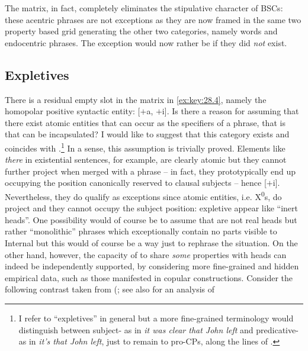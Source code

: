 \documentclass[output=paper]{langsci/langscibook}
\begin{document}
The matrix, in fact, completely eliminates the stipulative character of \glspl{BSC}:
these acentric phrases are not exceptions as they are now framed in the same
two property based grid generating the other two categories, namely words and
endocentric phrases. The exception would now rather be if they did \emph{not}
exist.

\subsection{Expletives}

There is a residual empty slot in the matrix in \eqref{ex:key:28.4}, namely the
homopolar positive syntactic entity: [$+$a, $+$i]. Is there a reason for assuming
that there exist atomic entities that can occur as the specifiers of a phrase,
that is that can be incapsulated? I would like to suggest that this category
exists and coincides with .\footnote{I refer to “expletives” in
    general but a more fine-grained terminology would distinguish between
    subject- as in \emph{it was clear that John left} and
    predicative- as in \emph{it's that John left}, just to remain to
    pro-CPs, along the lines of \citet{Moro1997}.} In a sense, this assumption
    is trivially proved. Elements like \emph{there} in  existential
    sentences, for example, are clearly atomic but they cannot further project
    when merged with a phrase -- in fact, they  prototypically end up occupying
    the position canonically reserved to clausal subjects -- hence [$+$i].
    Nevertheless, they do qualify as exceptions since atomic entities, i.e.
    X\textsuperscript{0}s, do project and they cannot occupy the subject
    position: expletive appear like “inert heads”. One possibility would of
    course be to assume that  are not real heads but rather
    “monolithic” phrases which exceptionally contain no parts visible to
    Internal  but this would of course be a way just to rephrase the
    situation.  On the other hand, however, the capacity of  to share
    \emph{some} properties with heads can indeed be independently supported, by
    considering more fine-grained and hidden empirical data, such as those
    manifested in copular constructions.  Consider the following contrast taken
    from \citeauthor{Moro1997} (\citeyear{Moro1997}; see also \citealt{Stepanov2007} for an analysis of
\end{document}
